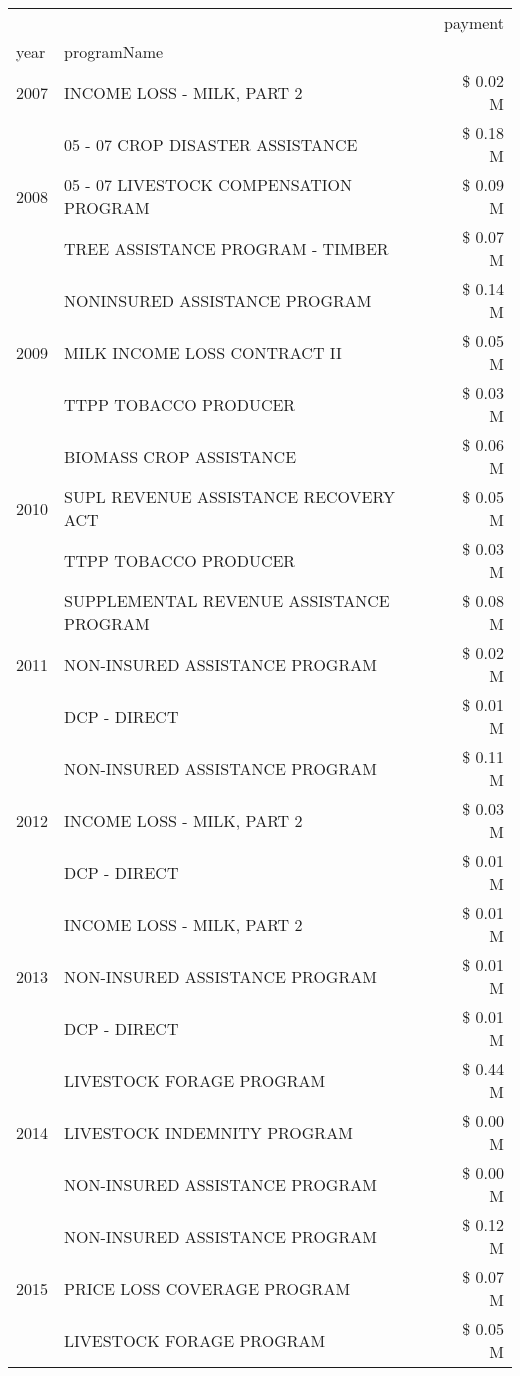 \begin{tabular}{llr}
\toprule
 &  & payment \\
year & programName &  \\
\midrule
2007 & INCOME LOSS - MILK, PART 2 & \$ 0.02 M \\
\cline{1-3}
\multirow[t]{3}{*}{2008} & 05 - 07 CROP DISASTER ASSISTANCE & \$ 0.18 M \\
 & 05 - 07 LIVESTOCK COMPENSATION PROGRAM & \$ 0.09 M \\
 & TREE ASSISTANCE PROGRAM - TIMBER & \$ 0.07 M \\
\cline{1-3}
\multirow[t]{3}{*}{2009} & NONINSURED ASSISTANCE PROGRAM & \$ 0.14 M \\
 & MILK INCOME LOSS CONTRACT II & \$ 0.05 M \\
 & TTPP TOBACCO PRODUCER & \$ 0.03 M \\
\cline{1-3}
\multirow[t]{3}{*}{2010} & BIOMASS CROP ASSISTANCE & \$ 0.06 M \\
 & SUPL REVENUE ASSISTANCE RECOVERY ACT & \$ 0.05 M \\
 & TTPP TOBACCO PRODUCER & \$ 0.03 M \\
\cline{1-3}
\multirow[t]{3}{*}{2011} & SUPPLEMENTAL REVENUE ASSISTANCE PROGRAM & \$ 0.08 M \\
 & NON-INSURED ASSISTANCE PROGRAM & \$ 0.02 M \\
 & DCP - DIRECT & \$ 0.01 M \\
\cline{1-3}
\multirow[t]{3}{*}{2012} & NON-INSURED ASSISTANCE PROGRAM & \$ 0.11 M \\
 & INCOME LOSS - MILK, PART 2 & \$ 0.03 M \\
 & DCP - DIRECT & \$ 0.01 M \\
\cline{1-3}
\multirow[t]{3}{*}{2013} & INCOME LOSS - MILK, PART 2 & \$ 0.01 M \\
 & NON-INSURED ASSISTANCE PROGRAM & \$ 0.01 M \\
 & DCP - DIRECT & \$ 0.01 M \\
\cline{1-3}
\multirow[t]{3}{*}{2014} & LIVESTOCK FORAGE PROGRAM & \$ 0.44 M \\
 & LIVESTOCK INDEMNITY PROGRAM & \$ 0.00 M \\
 & NON-INSURED ASSISTANCE PROGRAM & \$ 0.00 M \\
\cline{1-3}
\multirow[t]{3}{*}{2015} & NON-INSURED ASSISTANCE PROGRAM & \$ 0.12 M \\
 & PRICE LOSS COVERAGE PROGRAM & \$ 0.07 M \\
 & LIVESTOCK FORAGE PROGRAM & \$ 0.05 M \\

\end{tabular}
